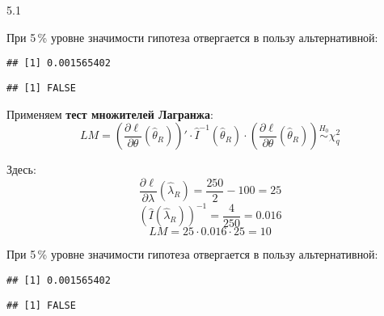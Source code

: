 \begin{solution}{{5.1}}
\begin{enumerate}
При 5\,\% уровне значимости гипотеза отвергается в пользу альтернативной:
\begin{knitrout}
\color{fgcolor}\begin{kframe}
\begin{alltt}
 \hlkwb{<-}  \hlopt{-} \hlstd{(}\hlstd{,}  \hlstd{=} \hlstd{)}
\end{alltt}
\begin{verbatim}
## [1] 0.001565402
\end{verbatim}
\begin{alltt}
 \hlopt{>}  
\end{alltt}
\begin{verbatim}
## [1] FALSE
\end{verbatim}
\end{kframe}
\end{knitrout}

Применяем \textbf{тест множителей Лагранжа}:
\[LM = \left(\dfrac{\partial \ell}{\partial \theta}\left(\hat{\theta}_R \right)\right)' \cdot \widehat{I}^{-1} \left(\hat{\theta}_R \right) \cdot \left(\dfrac{\partial \ell}{\partial \theta}\left(\hat{\theta}_R \right)\right) \overset{H_0}{\sim} \chi^2_q \]

Здесь:
\[\frac{\partial \ell}{\partial \lambda} \left(\hat{\lambda}_R \right) = \frac{250}{2} - 100 = 25\]
\[\left(\hat{I} \left(\hat{\lambda}_{R} \right) \right)^{-1} = \frac{4}{250} = 0.016\]
\[LM = 25 \cdot 0.016 \cdot 25 = 10\]

При 5\,\% уровне значимости гипотеза отвергается в пользу альтернативной:
\begin{knitrout}
\color{fgcolor}\begin{kframe}
\begin{alltt}
 \hlkwb{<-}  \hlopt{-} \hlstd{(}\hlstd{,}  \hlstd{=} \hlstd{)}
\end{alltt}
\begin{verbatim}
## [1] 0.001565402
\end{verbatim}
\begin{alltt}
 \hlopt{>}  
\end{alltt}
\begin{verbatim}
## [1] FALSE
\end{verbatim}
\end{kframe}
\end{knitrout}
\end{enumerate}

\end{solution}
